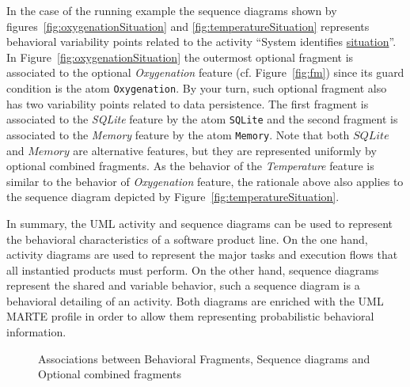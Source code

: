 In the case of the running example the sequence diagrams shown by
figures~\ref{fig:oxygenationSituation} and \ref{fig:temperatureSituation}
represents behavioral variability points related to the activity ``System
identifies \underline{situation}''. In Figure~\ref{fig:oxygenationSituation}
the outermost optional fragment is associated to the optional
\emph{Oxygenation} feature (cf. Figure~\ref{fig:fm}) since its guard condition
is the atom \texttt{Oxygenation}. By your turn, such optional fragment also has
two variability points related to data persistence. The first fragment is
associated to the \emph{SQLite} feature by the atom \texttt{SQLite} and the
second fragment is associated to the \emph{Memory} feature by the atom
\texttt{Memory}. Note that both $SQLite$ and $Memory$ are alternative features,
but they are represented uniformly by optional combined fragments. As the
behavior of the \emph{Temperature} feature is similar to the behavior of
\emph{Oxygenation} feature, the rationale above also applies to the sequence
diagram depicted by Figure~\ref{fig:temperatureSituation}.

\vspace{1cm}

In summary, the UML activity and sequence diagrams can be used to represent the
behavioral characteristics of a software product line. On the one hand, activity
diagrams are used to represent the major tasks and execution flows that all
instantied products must perform. On the other hand, sequence diagrams represent
the shared and variable behavior, such a sequence diagram is a behavioral
detailing of an activity. Both diagrams are enriched with the UML MARTE profile
in order to allow them representing probabilistic behavioral information.

\begin{figure}[h!]
\centering
{}
\caption{Associations between Behavioral Fragments, Sequence diagrams and Optional combined fragments}
\label{fig:nestedBehavioral}
\end{figure}

